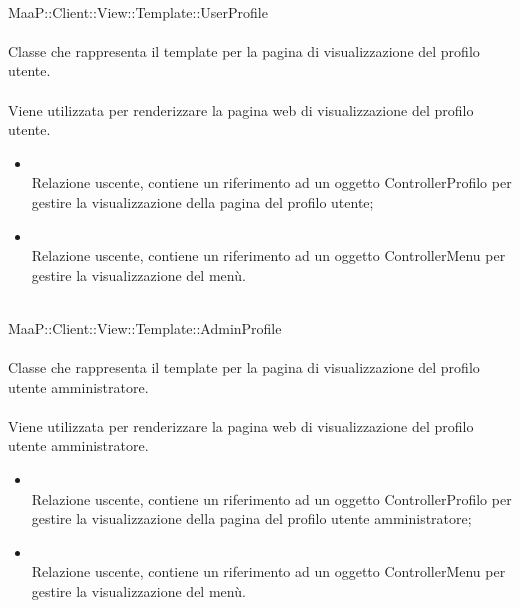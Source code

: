 	\\
	MaaP::Client::View::Template::UserProfile\\
	\\
	Classe che rappresenta il template per la pagina di visualizzazione del profilo utente.\\
	\\
	Viene utilizzata per renderizzare la pagina web di visualizzazione del profilo utente.\\
	\begin{itemize}
	\item{}\\
	Relazione uscente, contiene un riferimento ad un oggetto ControllerProfilo per gestire la visualizzazione della pagina del profilo utente;
	\item{}\\
	Relazione uscente, contiene un riferimento ad un oggetto ControllerMenu per gestire la visualizzazione del menù.
	\end{itemize}

	\\
	MaaP::Client::View::Template::AdminProfile\\
	\\
	Classe che rappresenta il template per la pagina di visualizzazione del profilo utente amministratore.\\
	\\
	Viene utilizzata per renderizzare la pagina web di visualizzazione del profilo utente amministratore.\\
	\begin{itemize}
	\item{}\\
	Relazione uscente, contiene un riferimento ad un oggetto ControllerProfilo per gestire la visualizzazione della pagina del profilo utente amministratore;
	\item{}\\
	Relazione uscente, contiene un riferimento ad un oggetto ControllerMenu per gestire la visualizzazione del menù.
	\end{itemize}
	
